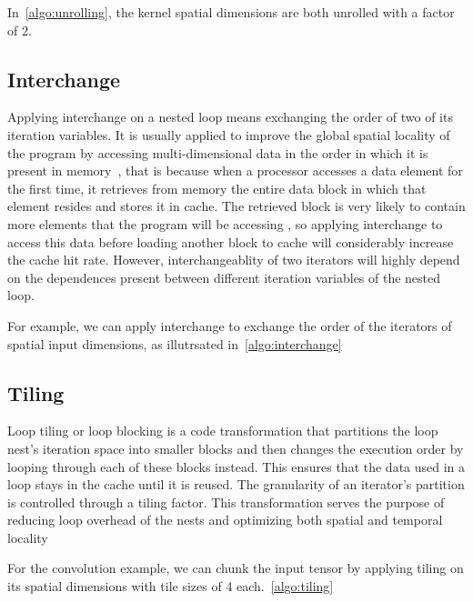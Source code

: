 In~\ref{algo:unrolling}, the kernel spatial dimensions are both unrolled with a factor of $2$.



\subsection{Interchange}
Applying interchange on a nested loop means exchanging the order of two of its iteration variables. It is usually applied to improve the global spatial locality of the program by accessing multi-dimensional data in the order in which it is present in memory~\cite{transfos}, that is because when a processor accesses a data element for the first time,  it retrieves from memory the entire data block in which that element resides and stores it in cache. The retrieved block is very likely to contain more elements that the program will be accessing , so applying interchange to access this data before loading another block to cache will considerably increase the cache hit rate. However, interchangeablity of two iterators will highly depend on the dependences present between different iteration variables of the nested loop.

For example, we can apply interchange to exchange the order of the iterators of spatial input dimensions, as illutrsated in~\ref{algo:interchange} 




\subsection{Tiling}
Loop tiling or loop blocking is a code transformation that partitions the loop nest’s iteration space into smaller blocks and then changes the execution order by looping through each of these blocks instead.  This ensures that the data used in a loop stays in the cache until it is reused. The granularity of an iterator’s partition is controlled through a tiling factor. This transformation serves the purpose of reducing loop overhead of the nests and optimizing both spatial and temporal locality~\cite{transfos}

For the convolution example, we can chunk the input tensor by applying tiling on its spatial dimensions with tile sizes of 4 each.~\ref{algo:tiling} 



